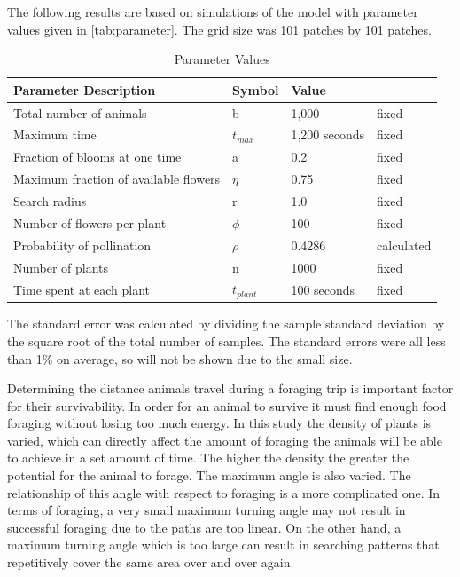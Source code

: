 The following results are based on simulations of the model with parameter
values given in \autoref{tab:parameter}.  The grid size was 101 patches by 101
patches.

\begin{table}
  \begin{tabular}{|l|l|l|l|}
    \hline
    Parameter Description & Symbol & Value &  \\ \hline  \label{parameter}
    Total number of animals & b & 1,000 & fixed  \\ \hline
    Maximum time & $t_{max}$ & 1,200 seconds & fixed \\ \hline
    Fraction of blooms at one time & a & 0.2 & fixed \\ \hline
    Maximum fraction of available flowers & $\eta$ & 0.75 & fixed \\ \hline
    Search radius & r & 1.0 & fixed \\ \hline
    Number of flowers per plant & $\phi$ & 100 & fixed \\ \hline
    Probability of pollination   & $\rho$ & 0.4286 & calculated \\ \hline
    Number of plants & n & 1000 & fixed \\ \hline
    Time spent at each plant & $t_{plant}$ & 100 seconds & fixed \\ \hline
  \end{tabular}
  \caption{Parameter Values}
  \label{tab:parameter}
\end{table}

The standard error was calculated by dividing the sample standard deviation by
the square root of the total number of samples.   The standard errors were all
less than 1\% on average, so will not be shown due to the small size.

Determining the distance animals travel during a foraging trip is important
factor for their survivability.  In order for an animal to survive it must find
enough food foraging without losing too much energy.  In this study the density
of plants is varied, which can directly affect the amount of foraging the
animals will be able to achieve in a set amount of time.  The higher the density
the greater the potential for the animal to forage.  The maximum angle is also
varied.  The relationship of this angle with respect to foraging is a more
complicated one.  In terms of foraging, a very small maximum turning angle may
not result in successful foraging due to the paths are too linear.  On the other
hand, a maximum turning angle which is too large can result in searching
patterns that repetitively cover the same area over and over again.

